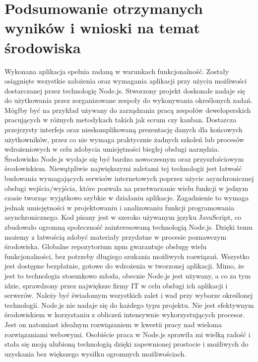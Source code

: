 \documentclass[12pt]{report}
\begin{document}
\chapter{Podsumowanie otrzymanych wyników i wnioski na temat środowiska}
Wykonana aplikacja spełnia zadaną w warunkach funkcjonalność. 
Zostały osiągnięte wszystkie założenia oraz wymagania aplikacji przy użyciu możliwości dostarczanej przez technologię Node.js. 
Stworzony projekt doskonale nadaje się do użytkowania przez zorganizowane zespoły do wykonywania określonych zadań. 
Mógłby być na przykład używany do zarządzania pracą zespołów deweloperskich pracujących w różnych metodykach takich jak scrum czy kanban. 
Dostarcza przejrzysty interfejs oraz nieskomplikowaną prezentację danych dla końcowych użytkowników, przez co nie wymaga praktycznie żadnych szkoleń lub procesów wdrożeniowych w celu zdobycia umiejętności biegłej obsługi narzędzia. 
Środowisko Node.js wydaje się być bardzo nowoczesnym oraz przyszłościowym środowiskiem. 
Niewątpliwie największymi zaletami tej technologii jest łatwość budowania wymagających serwisów internetowych poprzez użycie asynchronicznej obsługi wejścia/wyjścia, które pozwala na przetwarzanie wielu funkcji w jednym czasie tworząc wyjątkowo szybkie w działaniu aplikacje. 
Zagadnienie to wymaga jednak umiejętności w projektowaniu i analizowaniu funkcji programowania asynchronicznego. 
Kod pisany jest w szeroko używanym języku JavaScript, co zbudowało ogromną społeczność zainteresowaną technologią Node.js. 
Dzięki temu możemy z łatwością zdobyć materiały przydatne w procesie poznawczym środowiska. 
Globalne repozytorium npm gwarantuje obsługę wielu funkcjonalności, bez potrzeby długiego szukania możliwych rozwiązań. 
Wszystko jest dostępne bezpłatnie, gotowe do wdrożenia w tworzonej aplikacji. 
Mimo, że jest to technologia stosunkowo młoda, obecnie Node.js jest używany, a co za tym idzie, sprawdzony przez największe firmy IT w celu obsługi ich aplikacji i serwerów. 
Należy być świadomym wszystkich zalet i wad przy wyborze określonej technologii. 
Node.js nie nadaje się do każdego typu projektu. 
Nie jest efektywnym środowiskiem w korzystaniu z obliczeń intensywnie wykorzystujących procesor. 
Jest on natomiast idealnym rozwiązaniem w kwestii pracy nad wieloma rozwiązaniami webowymi. 
Osobiście praca w Node.js sprawiła mi wielką radość i stała się moją ulubioną technologią dzięki zapewnionej prostocie i możliwych do uzyskania bez większego wysiłku ogromnych możliwościach.
\end{document}

